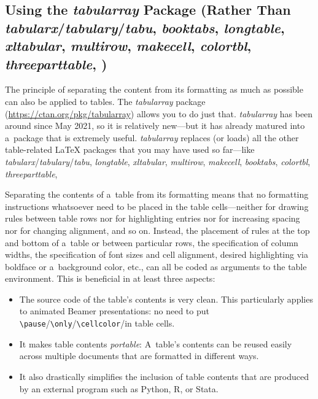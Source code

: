 \documentclass[12pt, a4paper, oneside]{article}
\theoremstyle{Plain}
\theoremstyle{Definition}
\theoremstyle{Remark}
\begin{document}
\subsection{Using the \mbox{\textit{tabularray}} Package (Rather Than \mbox{\textit{tabularx}}\slash \mbox{\textit{tabulary}}\slash \mbox{\textit{tabu}}, \mbox{\textit{booktabs}}, \mbox{\textit{longtable}}, \mbox{\textit{xltabular}}, \mbox{\textit{multirow}}, \mbox{\textit{makecell}}, \mbox{\textit{colortbl}}, \mbox{\textit{threeparttable}}, \textellipsis\!)}

The principle of separating the content from its formatting as much as possible can also be applied to tables. The \mbox{\textit{tabularray}} package (\url{https://ctan.org/pkg/tabularray}) allows you to do just that. \mbox{\textit{tabularray}} has been around since May 2021, so it is relatively new---but it has already matured into a~package that is extremely useful. \mbox{\textit{tabularray}} replaces (or loads) all the other table-related LaTeX packages that you may have used so far---like \mbox{\textit{tabularx}}\slash\mbox{\textit{tabulary}}\slash\mbox{\textit{tabu}}, \mbox{\textit{longtable}}, \mbox{\textit{xltabular}}, \mbox{\textit{multirow}}, \mbox{\textit{makecell}}, \mbox{\textit{booktabs}}, \mbox{\textit{colortbl}}, \mbox{\textit{threeparttable}}, \textellipsis

Separating the contents of a~table from its formatting means that no formatting instructions whatsoever need to be placed in the table cells---neither for drawing rules between table rows nor for highlighting entries nor for increasing spacing nor for changing alignment, and so on. Instead, the placement of rules at the top and bottom of a~table or between particular rows, the specification of column widths, the specification of font sizes and cell alignment, desired highlighting via boldface or a~background color, etc., can all be coded as arguments to the table environment. This is beneficial in at least three aspects:
\begin{itemize}
	\item The source code of the table's contents is very clean. This particularly applies to animated Beamer presentations: no need to put \verb|\pause|\slash \verb|\only|\slash \verb|\cellcolor|\slash\textellipsis in table cells.
	\item  It makes table contents \emph{portable}: A~table's contents can be reused easily across multiple documents that are formatted in different ways.
	\item  It also drastically simplifies the inclusion of table contents that are produced by an external program such as Python, R, or Stata.
\end{itemize}
\end{document}
